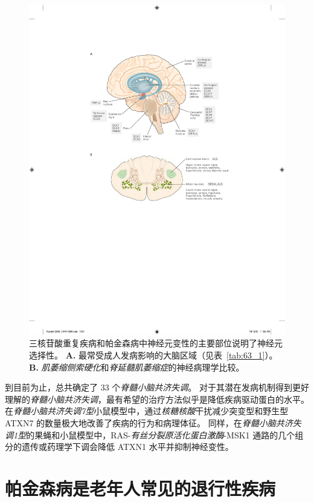 \begin{figure}[htbp]
	\centering
	\includegraphics[width=0.97\linewidth]{chap63/fig_63_2}
	\caption{三核苷酸重复疾病和帕金森病中神经元变性的主要部位说明了神经元选择性。
		\textbf{A.} 最常受成人发病影响的大脑区域（见表~\ref{tab:63_1}）。
		\textbf{B.} \textit{肌萎缩侧索硬化}和\textit{脊延髓肌萎缩症}的神经病理学比较。}
	\label{fig:63_2}
\end{figure}


到目前为止，总共确定了 33 个\textit{脊髓小脑共济失调}。
对于其潜在发病机制得到更好理解的\textit{脊髓小脑共济失调}，最有希望的治疗方法似乎是降低疾病驱动蛋白的水平。
在\textit{脊髓小脑共济失调7型}小鼠模型中，通过\textit{核糖核酸}干扰减少突变型和野生型 ATXN7 的数量极大地改善了疾病的行为和病理体征。
同样，在\textit{脊髓小脑共济失调1型}的果蝇和小鼠模型中，RAS-\textit{有丝分裂原活化蛋白激酶}-MSK1 通路的几个组分的遗传或药理学下调会降低 ATXN1 水平并抑制神经变性。



\section{帕金森病是老年人常见的退行性疾病}

